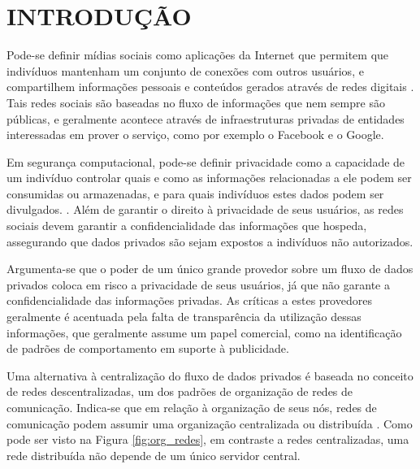 \chapter{INTRODUÇÃO}

Pode-se definir mídias sociais como aplicações da Internet que permitem que
indivíduos mantenham um conjunto de conexões com outros usuários, e compartilhem
informações pessoais e conteúdos gerados através de redes digitais \cite{boyd2007}.
Tais redes sociais são baseadas no fluxo de informações que nem sempre são públicas,
e geralmente acontece através de infraestruturas privadas de entidades interessadas
em prover o serviço, como por exemplo o Facebook e o Google. 

Em segurança computacional, pode-se definir privacidade como a capacidade de um
indivíduo controlar quais e como as informações relacionadas a ele podem ser
consumidas ou armazenadas, e para quais indivíduos estes dados podem ser divulgados.
\cite{stallings2010}. Além de garantir o direito à privacidade de seus usuários,
as redes sociais devem garantir a confidencialidade das informações que hospeda,
assegurando que dados privados são sejam expostos a indivíduos não autorizados.

Argumenta-se que o poder de um único grande provedor sobre um fluxo de dados
privados coloca em risco a privacidade de seus usuários, já que não garante a
confidencialidade das informações privadas. As críticas a estes provedores
geralmente é acentuada pela falta de transparência da utilização dessas informações,
que geralmente assume um papel comercial, como na identificação de padrões de
comportamento em suporte à publicidade. 

Uma alternativa à centralização do fluxo de dados privados é baseada no conceito
de redes descentralizadas, um dos padrões de organização de redes de comunicação.
Indica-se que em relação à organização de seus nós, redes de comunicação podem
assumir uma organização centralizada ou distribuída \cite{baran1964}. Como pode ser
visto na Figura \ref{fig:org_redes}, em contraste a redes centralizadas, uma rede
distribuída não depende de um único servidor central.


